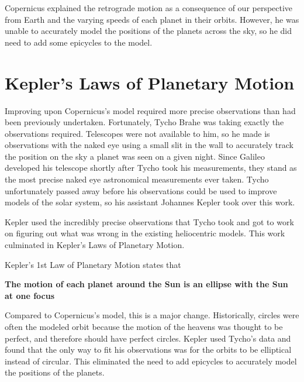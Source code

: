 \documentclass[12pt]{book}
\begin{document}
Copernicus explained the retrograde motion as a consequence of our perspective from Earth and the varying speeds of each planet in their orbits. However, he was unable to accurately model the positions of the planets across the sky, so he did need to add some epicycles to the model.

\section{Kepler's Laws of Planetary Motion}

Improving upon Copernicus's model required more precise observations than had been previously undertaken. Fortunately, Tycho Brahe was taking exactly the observations required. Telescopes were not available to him, so he made is observations with the naked eye using a small slit in the wall to accurately track the position on the sky a planet was seen on a given night. Since Galileo developed his telescope shortly after Tycho took his measurements, they stand as the most precise naked eye astronomical measurements ever taken. Tycho unfortunately passed away before his observations could be used to improve models of the solar system, so his assistant Johannes Kepler took over this work.

Kepler used the incredibly precise observations that Tycho took and got to work on figuring out what was wrong in the existing heliocentric models. This work culminated in Kepler's Laws of Planetary Motion.

\linespace

Kepler's 1st Law of Planetary Motion states that

\hspace{10pt}

\textbf{The motion of each planet around the Sun is an ellipse with the Sun at one focus}

\linespace

Compared to Copernicus's model, this is a major change. Historically, circles were often the modeled orbit because the motion of the heavens was thought to be perfect, and therefore should have perfect circles. Kepler used Tycho's data and found that the only way to fit his observations was for the orbits to be elliptical instead of circular. This eliminated the need to add epicycles to accurately model the positions of the planets.
\end{document}
